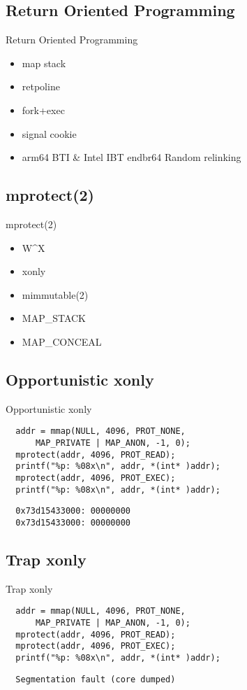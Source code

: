 \documentclass[14pt,aspectratio=169]{beamer}
\begin{document}
\subsection{Return Oriented Programming}
\begin{frame}{Return Oriented Programming}
\begin{itemize}
  \item map stack
  \item retpoline
  \item fork+exec
  \item signal cookie
  \item arm64 BTI \& Intel IBT endbr64
Random relinking
\end{itemize}
\end{frame}

\subsection{mprotect(2)}
\begin{frame}{mprotect(2)}
\begin{itemize}
  \item W\^{}X
  \item xonly
  \item mimmutable(2)
  \item MAP\_STACK
  \item MAP\_CONCEAL
\end{itemize}
\end{frame}

\subsection{Opportunistic xonly}
\begin{frame}[fragile=singleslide]{Opportunistic xonly}
\begin{verbatim}
  addr = mmap(NULL, 4096, PROT_NONE,
      MAP_PRIVATE | MAP_ANON, -1, 0);
  mprotect(addr, 4096, PROT_READ);
  printf("%p: %08x\n", addr, *(int* )addr);
  mprotect(addr, 4096, PROT_EXEC);
  printf("%p: %08x\n", addr, *(int* )addr);
\end{verbatim}
\begin{verbatim}
  0x73d15433000: 00000000
  0x73d15433000: 00000000
\end{verbatim}
\end{frame}

\subsection{Trap xonly}
\begin{frame}[fragile=singleslide]{Trap xonly}
\begin{verbatim}
  addr = mmap(NULL, 4096, PROT_NONE,
      MAP_PRIVATE | MAP_ANON, -1, 0);
  mprotect(addr, 4096, PROT_READ);
  mprotect(addr, 4096, PROT_EXEC);
  printf("%p: %08x\n", addr, *(int* )addr);
\end{verbatim}
\begin{verbatim}
  Segmentation fault (core dumped)
\end{verbatim}
\end{frame}
\end{document}
